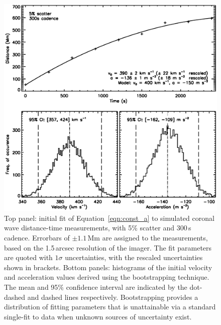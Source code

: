 \documentclass[structabstract]{aa}
\begin{document}
\begin{figure}
\begin{center}
\includegraphics[scale=0.45, trim=20 50 0 0, clip=true]{images/cad_boot_weight_jpb.eps}
\caption{Top panel: initial fit of Equation~\ref{eqn:const_a} to simulated coronal wave distance-time measurements, with 5\% scatter and 300\,s cadence. Errorbars of $\pm1.1$\,Mm are assigned to the measurements, based on the 1.5\,arcsec resolution of the imager. The fit parameters are quoted with $1\sigma$ uncertainties, with the rescaled uncertainties shown in brackets. Bottom panels: histograms of the initial velocity and acceleration values derived using the bootstrapping technique. The mean and 95\% confidence interval are indicated by the dot-dashed and dashed lines respectively. Bootstrapping provides a distribution of fitting parameters that is unattainable via a standard single-fit to data when unknown sources of uncertainty exist.}
\label{cad_boot_weight}
\end{center}
\end{figure}
\end{document}
